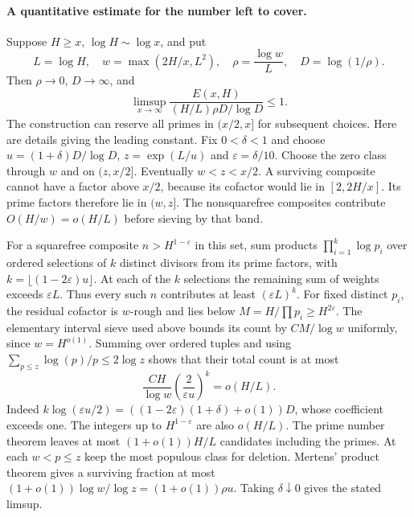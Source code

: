 \documentclass[11pt]{article}
\newcommand{\holes}{E}
\begin{document}
\paragraph{A quantitative estimate for the number left to cover.}
Suppose $H\ge x$, $\log H\sim\log x$, and put
\[
 L=\log H,\quad w=\max(2H/x,L^2),\quad
 \rho=\frac{\log w}{L},\quad D=\log(1/\rho).
\]
Then $\rho\to0$, $D\to\infty$, and
\[
 \limsup_{x\to\infty}
 \frac{\holes(x,H)}
 {(H/L)\rho D/\log D}\le 1 .
\]
The construction can reserve all primes in $(x/2,x]$ for subsequent
choices. Here are details giving the leading constant. Fix $0<\delta<1$
and choose $u=(1+\delta)D/\log D$, $z=\exp(L/u)$ and
$\varepsilon=\delta/10$. Choose the zero class through $w$ and on
$(z,x/2]$. Eventually $w<z<x/2$. A surviving composite cannot
have a factor above $x/2$, because its cofactor would lie in $[2,2H/x]$.
Its prime factors therefore lie in $(w,z]$. The nonsquarefree
composites contribute $O(H/w)=o(H/L)$ before sieving by that band.

For a squarefree composite $n> H^{1-\varepsilon}$ in this set,
sum products $\prod_{i=1}^k\log p_i$ over ordered selections of $k$
distinct divisors from its prime factors, with
$k=\lfloor(1-2\varepsilon)u\rfloor$. At each of the $k$ selections
the remaining sum of weights exceeds $\varepsilon L$.
Thus every such $n$ contributes at least $(\varepsilon L)^k$.
For fixed distinct $p_i$, the residual cofactor is $w$-rough and lies
below $M=H/\prod p_i\ge H^{2\varepsilon}$. The elementary interval
sieve used above bounds its count by $C M/\log w$ uniformly, since
$w=H^{o(1)}$. Summing over ordered tuples and using
$\sum_{p\le z}\log(p)/p\le 2\log z$ shows that their total count is at
most
\[
 \frac{C H}{\log w}\left(\frac{2}{\varepsilon u}\right)^k=o(H/L).
\]
Indeed $k\log(\varepsilon u/2) =
((1-2\varepsilon)(1+\delta)+o(1))D$, whose coefficient exceeds one.
The integers up to $H^{1-\varepsilon}$ are also $o(H/L)$.
The prime number theorem leaves at most $(1+o(1))H/L$ candidates
including the primes. At each $w<p\le z$ keep the most populous
class for deletion. Mertens' product theorem gives a surviving
fraction at most $(1+o(1))\log w/\log z=(1+o(1))\rho u$.
Taking $\delta\downarrow0$ gives the stated limsup.
\end{document}
